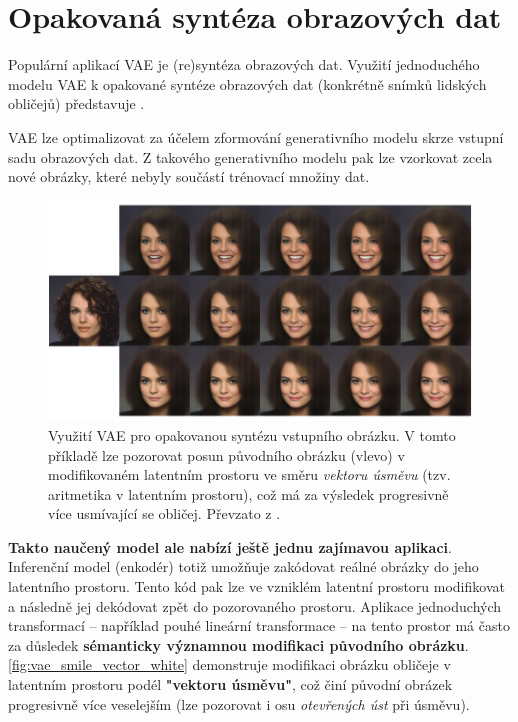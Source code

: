 \newpage
\section{Opakovaná syntéza obrazových dat}
\label{sec:applications_image_resynthesis}
Populární aplikací VAE je (re)syntéza obrazových dat.
Využití jednoduchého modelu VAE k opakované syntéze obrazových dat (konkrétně snímků lidských obličejů) představuje \textcite{White2016}.

VAE lze optimalizovat za účelem zformování generativního modelu skrze vstupní sadu obrazových dat.
Z takového generativního modelu pak lze vzorkovat zcela nové obrázky, které nebyly součástí trénovací množiny dat. \cite{Kingma2019}

\begin{figure}[H]
    \centering
    \includegraphics[width=\textwidth]{figures/applications/vae_smile_vector_white.png}
    \caption{Využití VAE pro opakovanou syntézu vstupního obrázku. V tomto příkladě lze pozorovat posun původního obrázku (vlevo) v modifikovaném latentním prostoru ve směru \emph{vektoru úsměvu} (tzv. aritmetika v latentním prostoru), což má za výsledek progresivně více usmívající se obličej. Převzato z \textcite{White2016}.}
    \label{fig:vae_smile_vector_white}
\end{figure}


\textbf{Takto naučený model ale nabízí ještě jednu zajímavou aplikaci}.
Inferenční model (enkodér) totiž umožňuje zakódovat reálné obrázky do jeho latentního prostoru.
Tento kód pak lze ve vzniklém latentní prostoru modifikovat a následně jej dekódovat zpět do pozorovaného prostoru.
Aplikace jednoduchých transformací – například pouhé lineární transformace – na tento prostor má často za důsledek \textbf{sémanticky významnou modifikaci původního obrázku}.
\autoref{fig:vae_smile_vector_white} demonstruje modifikaci obrázku obličeje v latentním prostoru podél \textbf{"vektoru úsměvu"}, což činí původní obrázek progresivně více veselejším (lze pozorovat i osu \emph{otevřených úst} při úsměvu). \cite{Kingma2019}

